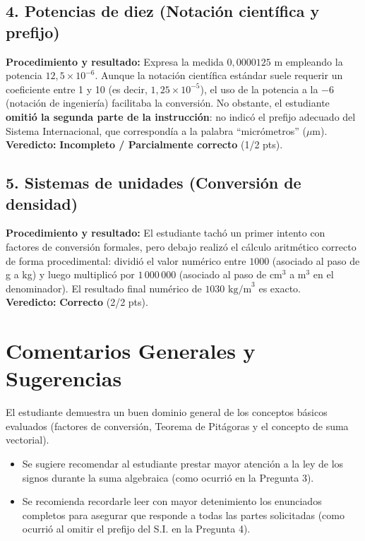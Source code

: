 \documentclass[12pt]{article}
\begin{document}
\subsection*{4. Potencias de diez (Notación científica y prefijo)}
\textbf{Procedimiento y resultado:} Expresa la medida $0,0000125$ m empleando la potencia $12,5 \times 10^{-6}$. Aunque la notación científica estándar suele requerir un coeficiente entre 1 y 10 (es decir, $1,25 \times 10^{-5}$), el uso de la potencia a la $-6$ (notación de ingeniería) facilitaba la conversión. No obstante, el estudiante \textbf{omitió la segunda parte de la instrucción}: no indicó el prefijo adecuado del Sistema Internacional, que correspondía a la palabra ``micrómetros'' ($\mu$m). \\
\textbf{Veredicto:} \textbf{Incompleto / Parcialmente correcto} (1/2 pts).

\subsection*{5. Sistemas de unidades (Conversión de densidad)}
\textbf{Procedimiento y resultado:} El estudiante tachó un primer intento con factores de conversión formales, pero debajo realizó el cálculo aritmético correcto de forma procedimental: dividió el valor numérico entre $1000$ (asociado al paso de g a kg) y luego multiplicó por $1\,000\,000$ (asociado al paso de $\text{cm}^3$ a $\text{m}^3$ en el denominador). El resultado final numérico de $1030 \text{ kg/m}^3$ es exacto. \\
\textbf{Veredicto:} \textbf{Correcto} (2/2 pts).

\vspace{0.5cm}
\section*{Comentarios Generales y Sugerencias}
El estudiante demuestra un buen dominio general de los conceptos básicos evaluados (factores de conversión, Teorema de Pitágoras y el concepto de suma vectorial). 
\begin{itemize}
    \item Se sugiere recomendar al estudiante prestar mayor atención a la ley de los signos durante la suma algebraica (como ocurrió en la Pregunta 3).
    \item Se recomienda recordarle leer con mayor detenimiento los enunciados completos para asegurar que responde a todas las partes solicitadas (como ocurrió al omitir el prefijo del S.I. en la Pregunta 4).
\end{itemize}
\end{document}
